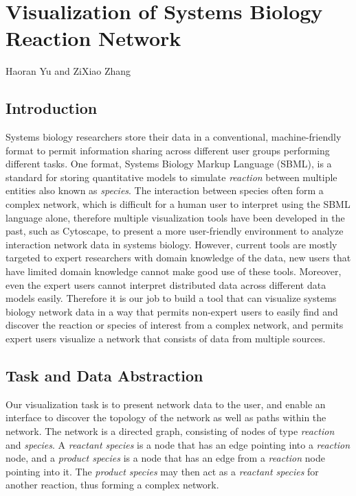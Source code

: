 \documentclass[12pt]{article}
\begin{document}
\section*{Visualization of Systems Biology Reaction Network}

Haoran Yu and ZiXiao Zhang

\subsection*{Introduction}

Systems biology researchers store their data in a conventional, machine-friendly format to permit information sharing across different user groups performing different tasks. One format, Systems Biology Markup Language (SBML), is a standard for storing quantitative models to simulate \emph{reaction} between multiple entities also known as \emph{species}. The interaction between species often form a complex network, which is difficult for a human user to interpret using the SBML language alone, therefore multiple visualization tools have been developed in the past, such as Cytoscape, to present a more user-friendly environment to analyze interaction network data in systems biology. However, current tools are mostly targeted to expert researchers with domain knowledge of the data, new users that have limited domain knowledge cannot make good use of these tools. Moreover, even the expert users cannot interpret distributed data across different data models easily. Therefore it is our job to build a tool that can visualize systems biology network data in a way that permits non-expert users to easily find and discover the reaction or species of interest from a complex network, and permits expert users visualize a network that consists of data from multiple sources. 

\subsection*{Task and Data Abstraction}
Our visualization task is to present network data to the user, and enable an interface to discover the topology of the network as well as paths within the network. The network is a directed graph, consisting of nodes of type \emph{reaction} and \emph{species}. A \emph{reactant species} is a node that has an edge pointing into a \emph{reaction} node, and a \emph{product species} is a node that has an edge from a \emph{reaction} node pointing into it. The \emph{product species} may then act as a \emph{reactant species} for another reaction, thus forming a complex network.
\end{document}
